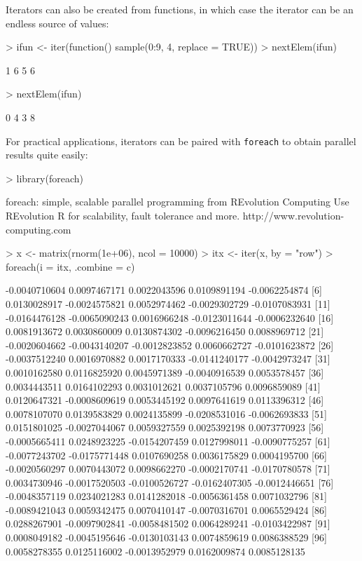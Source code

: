 \documentclass[12pt]{article}
\begin{document}
Iterators can also be created from functions, in which case the iterator can be an endless source of values:
\begin{Schunk}
\begin{Sinput}
> ifun <- iter(function() sample(0:9, 4, replace = TRUE))
> nextElem(ifun)
\end{Sinput}
\begin{Soutput}
[1] 1 6 5 6
\end{Soutput}
\begin{Sinput}
> nextElem(ifun)
\end{Sinput}
\begin{Soutput}
[1] 0 4 3 8
\end{Soutput}
\end{Schunk}

For practical applications, iterators can be paired with \texttt{foreach} to obtain parallel results quite easily:
\begin{Schunk}
\begin{Sinput}
> library(foreach)
\end{Sinput}
\begin{Soutput}
foreach: simple, scalable parallel programming from REvolution Computing
Use REvolution R for scalability, fault tolerance and more.
http://www.revolution-computing.com
\end{Soutput}
\begin{Sinput}
> x <- matrix(rnorm(1e+06), ncol = 10000)
> itx <- iter(x, by = "row")
> foreach(i = itx, .combine = c) %dopar% mean(i)
\end{Sinput}
\begin{Soutput}
  [1] -0.0040710604  0.0097467171  0.0022043596  0.0109891194 -0.0062254874
  [6]  0.0130028917 -0.0024575821  0.0052974462 -0.0029302729 -0.0107083931
 [11] -0.0164476128 -0.0065090243  0.0016966248 -0.0123011644 -0.0006232640
 [16]  0.0081913672  0.0030860009  0.0130874302 -0.0096216450  0.0088969712
 [21] -0.0020604662 -0.0043140207 -0.0012823852  0.0060662727 -0.0101623872
 [26] -0.0037512240  0.0016970882  0.0017170333 -0.0141240177 -0.0042973247
 [31]  0.0010162580  0.0116825920  0.0045971389 -0.0040916539  0.0053578457
 [36]  0.0034443511  0.0164102293  0.0031012621  0.0037105796  0.0096859089
 [41]  0.0120647321 -0.0008609619  0.0053445192  0.0097641619  0.0113396312
 [46]  0.0078107070  0.0139583829  0.0024135899 -0.0208531016 -0.0062693833
 [51]  0.0151801025 -0.0027044067  0.0059327559  0.0025392198  0.0073770923
 [56] -0.0005665411  0.0248923225 -0.0154207459  0.0127998011 -0.0090775257
 [61] -0.0077243702 -0.0175771448  0.0107690258  0.0036175829  0.0004195700
 [66] -0.0020560297  0.0070443072  0.0098662270 -0.0002170741 -0.0170780578
 [71]  0.0034730946 -0.0017520503 -0.0100526727 -0.0162407305 -0.0012446651
 [76] -0.0048357119  0.0234021283  0.0141282018 -0.0056361458  0.0071032796
 [81] -0.0089421043  0.0059342475  0.0070410147 -0.0070316701  0.0065529424
 [86]  0.0288267901 -0.0097902841 -0.0058481502  0.0064289241 -0.0103422987
 [91]  0.0008049182 -0.0045195646 -0.0130103143  0.0074859619  0.0086388529
 [96]  0.0058278355  0.0125116002 -0.0013952979  0.0162009874  0.0085128135
\end{Soutput}
\end{Schunk}
\end{document}
